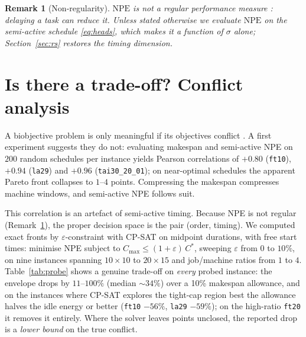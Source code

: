 \documentclass[preprint,12pt]{elsarticle}
\newtheorem{remark}{Remark}
\newcommand{\Cmax}{C_{\max}}
\newcommand{\NPE}{\mathrm{NPE}}
\begin{document}
\begin{remark}[Non-regularity]
\label{rem:nonregular}
$\NPE$ is not a regular performance measure \cite{Afsar2022}: delaying a
task can reduce it. Unless stated otherwise we evaluate $\NPE$ on the
semi-active schedule \eqref{eq:heads}, which makes it a function of
$\sigma$ alone; Section~\ref{sec:rs} restores the timing dimension.
\end{remark}

\section{Is there a trade-off? Conflict analysis}
\label{sec:conflict}

A biobjective problem is only meaningful if its objectives conflict
\cite{Afsar2022}. A first experiment suggests they do not: evaluating
makespan and semi-active NPE on $200$ random schedules per instance yields
Pearson correlations of $+0.80$ (\texttt{ft10}), $+0.94$ (\texttt{la29})
and $+0.96$ (\texttt{tai30\_20\_01}); on near-optimal schedules the
apparent Pareto front collapses to $1$--$4$ points. Compressing the
makespan compresses machine windows, and semi-active NPE follows suit.

This correlation is an artefact of semi-active timing. Because NPE is not
regular (Remark~\ref{rem:nonregular}), the proper decision space is the
pair (order, timing). We computed exact fronts by
$\varepsilon$-constraint with CP-SAT on midpoint durations, with free
start times: minimise NPE subject to $\Cmax\le(1+\varepsilon)\,C^*$,
sweeping $\varepsilon$ from $0$ to $10\%$, on nine instances spanning
$10{\times}10$ to $20{\times}15$ and job/machine ratios from $1$ to $4$.
Table~\ref{tab:probe} shows a genuine trade-off on \emph{every} probed
instance: the envelope drops by $11$--$100\%$ (median ${\sim}34\%$) over a
10\% makespan allowance, and on the instances where CP-SAT explores the
tight-cap region best the allowance halves the idle energy or better
(\texttt{ft10} $-56\%$, \texttt{la29} $-59\%$); on the high-ratio
\texttt{ft20} it removes it entirely. Where the solver leaves points
unclosed, the reported drop is a \emph{lower bound} on the true conflict.
\end{document}

